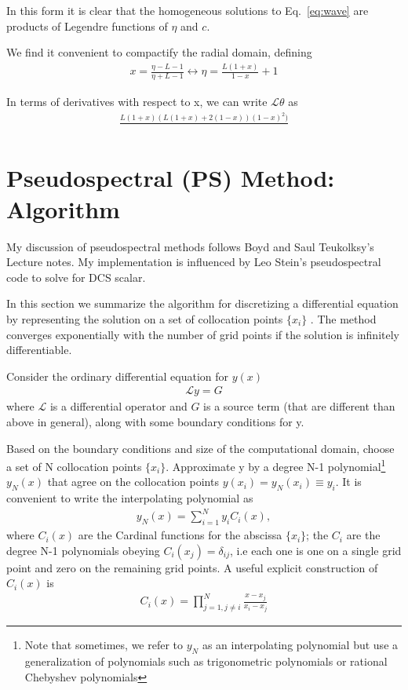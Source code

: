 \documentclass[aps,prd,amsmath,showpacs,amssymb,superscriptaddress,nofootinbib,longbibliography,eqsecnum,preprintnumbers]{revtex4-1}
\begin{document}
In this form it is clear that the homogeneous solutions to Eq.~\eqref{eq:wave} are products of Legendre functions of $\eta$ and $c$.

We find it convenient to compactify the radial domain, defining
\begin{align}
x=\frac{\eta-L-1}{\eta +L-1} \leftrightarrow \eta=\frac{L(1+x)}{1-x}+1
\end{align}

In terms of derivatives with respect to x, we can write $\mathcal{L}\theta$ as
\begin{align}
\frac{L(1+x)(L(1+x)+2(1-x))(1-x)^2)}{}
\end{align}

\section{Pseudospectral (PS) Method: Algorithm}
My discussion of pseudospectral methods follows Boyd \cite{Boyd99chebyshevand} and Saul Teukolksy's Lecture notes. My implementation is influenced by Leo Stein's pseudospectral code to solve for DCS scalar.

In this section we summarize the algorithm for discretizing a differential equation by representing the solution on a set of collocation points $\{x_i\}$ . The method converges exponentially with the number of grid points if the solution is infinitely differentiable.

Consider the ordinary differential equation for $y(x)$
\begin{align}
\mathcal{L} y = G \label{eq:ODE}
\end{align}
where $\mathcal L$ is a differential operator and $G$ is a source term (that are different than above in general), along with some boundary conditions for y.

Based on the boundary conditions and size of the computational domain, choose a set of N collocation points $\{x_i\}$. 
Approximate y by a degree N-1 polynomial\footnote{Note that sometimes, we refer to $y_N$ as an interpolating polynomial but use a generalization of polynomials such as trigonometric polynomials or rational Chebyshev polynomials} $y_N(x)$ that agree on the collocation points $y(x_i)=y_N(x_i)\equiv y_i$. It is convenient to write the interpolating polynomial as
\begin{align}
y_N(x)=\sum_{i=1}^N y_i C_i(x),
\end{align}
where $C_i(x)$ are the Cardinal functions for the abscissa $\{x_i\}$; the ${C_i}$ are the degree N-1 polynomials obeying $C_i(x_j)=\delta_{ij}$, i.e each one is one on a single grid point and zero on the remaining grid points. A useful explicit construction of $C_i(x)$ is 
\begin{align}
C_i(x)=\prod_{j=1, j\neq i}^N\frac{x-x_j}{x_i-x_j}
\end{align}
\end{document}
